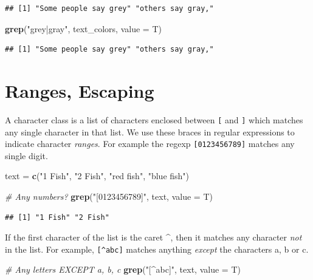 \documentclass[
]{book}
\newenvironment{Shaded}{\begin{snugshade}}{\end{snugshade}}
\newcommand{\CommentTok}[1]{\textcolor[rgb]{0.56,0.35,0.01}{\textit{#1}}}
\newcommand{\DataTypeTok}[1]{\textcolor[rgb]{0.13,0.29,0.53}{#1}}
\newcommand{\KeywordTok}[1]{\textcolor[rgb]{0.13,0.29,0.53}{\textbf{#1}}}
\newcommand{\NormalTok}[1]{#1}
\newcommand{\StringTok}[1]{\textcolor[rgb]{0.31,0.60,0.02}{#1}}
\begin{document}
\begin{verbatim}
## [1] "Some people say grey" "others say gray,"
\end{verbatim}

\begin{Shaded}
\begin{Highlighting}[]
\KeywordTok{grep}\NormalTok{(}\StringTok{"grey|gray"}\NormalTok{, text_colors, }\DataTypeTok{value =}\NormalTok{ T)}
\end{Highlighting}
\end{Shaded}

\begin{verbatim}
## [1] "Some people say grey" "others say gray,"
\end{verbatim}

\hypertarget{ranges-escaping}{%
\section{Ranges, Escaping}\label{ranges-escaping}}

A character class is a list of characters enclosed between \texttt{{[}} and \texttt{{]}} which matches any single character in that list. We use these braces in regular expressions to indicate character \emph{ranges}. For example the regexp \texttt{{[}0123456789{]}} matches any single digit.

\begin{Shaded}
\begin{Highlighting}[]
\NormalTok{text =}\StringTok{ }\KeywordTok{c}\NormalTok{(}\StringTok{"1 Fish"}\NormalTok{, }\StringTok{"2 Fish"}\NormalTok{, }\StringTok{"red fish"}\NormalTok{, }\StringTok{"blue fish"}\NormalTok{)}

\CommentTok{# Any numbers?}
\KeywordTok{grep}\NormalTok{(}\StringTok{"[0123456789]"}\NormalTok{, text, }\DataTypeTok{value =}\NormalTok{ T)}
\end{Highlighting}
\end{Shaded}

\begin{verbatim}
## [1] "1 Fish" "2 Fish"
\end{verbatim}

If the first character of the list is the caret \^{}, then it matches any character \emph{not} in the list. For example, \texttt{{[}\^{}abc{]}} matches anything \emph{except} the characters a, b or c.

\begin{Shaded}
\begin{Highlighting}[]
\CommentTok{# Any letters EXCEPT a, b, c}
\KeywordTok{grep}\NormalTok{(}\StringTok{"[^abc]"}\NormalTok{, text, }\DataTypeTok{value =}\NormalTok{ T)}
\end{Highlighting}
\end{Shaded}
\end{document}
